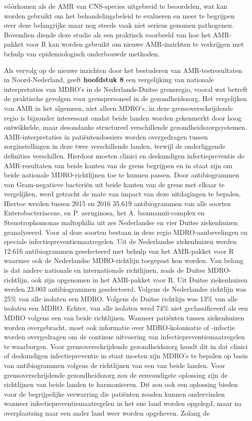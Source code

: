 \documentclass[
]{book}
\begin{document}
vóórkomen als de AMR van CNS-species uitgebreid te beoordelen, wat kan worden gebruikt om het behandelingsbeleid te evalueren en meer te begrijpen over deze belangrijke maar nog steeds vaak niet serieus genomen pathogenen. Bovendien diende deze studie als een praktisch voorbeeld van hoe het AMR-pakket voor R kan worden gebruikt om nieuwe AMR-inzichten te verkrijgen met behulp van epidemiologisch onderbouwde methoden.

Als vervolg op de nieuwe inzichten door het bestuderen van AMR-testresultaten in Noord-Nederland, geeft \textbf{hoofdstuk 8} een vergelijking van nationale interpretaties van MDRO's in de Nederlands-Duitse grensregio, vooral wat betreft de praktische gevolgen voor grenspersoneel in de gezondheidszorg. Het vergelijken van AMR in het algemeen, niet alleen MDRO's, in deze grensoverschrijdende regio is bijzonder interessant omdat beide landen worden gekenmerkt door hoog ontwikkelde, maar desondanks structureel verschillende gezondheidszorgsystemen. AMR-interpretaties in patiëntendossiers worden overgedragen tussen zorginstellingen in deze twee verschillende landen, terwijl de onderliggende definities verschillen. Hierdoor moeten clinici en deskundigen infectiepreventie de AMR-resultaten van beide kanten van de grens begrijpen en in staat zijn om beide nationale MDRO-richtlijnen toe te kunnen passen. Door antibiogrammen van Gram-negatieve bacteriën uit beide kanten van de grens met elkaar te vergelijken, werd getracht de mate van impact van deze uitdagingen te bepalen. Hiertoe werden tussen 2015 en 2016 35.619 antibiogrammen van alle soorten Enterobacteriaceae, en P. aeruginosa, het A. baumannii-complex en Stenotrophomonas maltophilia uit zes Nederlandse en vier Duitse ziekenhuizen geanalyseerd. Voor al deze soorten bestaan in deze regio MDRO-aanbevelingen en speciale infectiepreventiemaatregelen. Uit de Nederlandse ziekenhuizen werden 12.616 antibiogrammen geselecteerd met behulp van het AMR-pakket voor R waarmee ook de Nederlandse MDRO-richtlijn toegepast kon worden. Van belang is dat andere nationale en internationale richtlijnen, zoals de Duitse MDRO-richtlijn, ook zijn opgenomen in het AMR-pakket voor R. Uit Duitse ziekenhuizen werden 23.003 antibiogrammen geselecteerd. Volgens de Nederlandse richtlijn was 25\% van alle isolaten een MDRO. Volgens de Duitse richtlijn was 13\% van alle isolaten een MDRO. Echter, van alle isolaten werd 74\% niet geclassificeerd als een MDRO volgens een van beide richtlijnen. Wanneer patiënten tussen ziekenhuizen worden overgebracht, moet ook informatie over MDRO-kolonisatie of -infectie worden overgedragen om de continue uitvoering van infectiepreventiemaatregelen te waarborgen. Voor grensoverschrijdende gezondheidszorg houdt dit in dat clinici of deskundigen infectiepreventie in staat moeten zijn MDRO's te bepalen op basis van antibiogrammen volgens de richtlijnen van een van beide landen. Voor grensoverschrijdende gezondheidszorg zou de eenvoudigste oplossing zijn de richtlijnen van beide landen te harmoniseren. Dit zou ook een oplossing bieden voor de begrijpelijke verwarring die patiënten zouden kunnen ondervinden wanneer infectiepreventiemaatregelen in het ene land worden opgelegd, maar na overplaatsing naar een ander land weer worden opgeheven. Zolang de 
\end{document}
